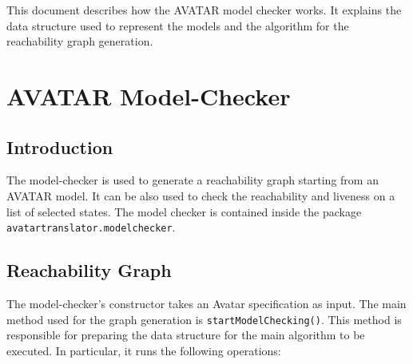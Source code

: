 \documentclass[12pt]{article}
\begin{document}
This document describes how the AVATAR model checker works. It explains the data structure used to represent the models and the algorithm for the reachability graph generation.

\newpage 

\section{AVATAR Model-Checker}
\label{sec:am}




\subsection{Introduction}
The model-checker is used to generate a reachability graph starting from an AVATAR model. It can be also used to check the reachability and liveness on a list of selected states. The model checker is contained inside the package \texttt{avatartranslator.modelchecker}.




\subsection{Reachability Graph}
The model-checker's constructor takes an Avatar specification as input. The main method used for the graph generation is \texttt{startModelChecking()}. This method is responsible for preparing the data structure for the main algorithm to be executed. In particular, it runs the following operations:
\end{document}
